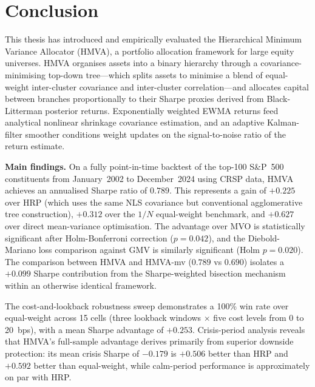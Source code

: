 \documentclass[a4paper,12pt]{report}
\begin{document}
\chapter{Conclusion}
\label{ch:conclusion}

This thesis has introduced and empirically evaluated the Hierarchical Minimum
Variance Allocator (HMVA), a portfolio allocation framework for large equity
universes. HMVA organises assets into a binary hierarchy through a
covariance-minimising top-down tree---which splits assets to minimise a
blend of equal-weight inter-cluster covariance and inter-cluster
correlation---and allocates capital between branches proportionally to their
Sharpe proxies derived from Black-Litterman posterior returns. Exponentially
weighted EWMA returns feed analytical nonlinear shrinkage covariance
estimation, and an adaptive Kalman-filter smoother conditions weight updates
on the signal-to-noise ratio of the return estimate.

\textbf{Main findings.} On a fully point-in-time backtest of the top-100
S\&P~500 constituents from January~2002 to December~2024 using CRSP data,
HMVA achieves an annualised Sharpe ratio of $0.789$. This represents a
gain of $+0.225$ over HRP (which uses the same NLS covariance but
conventional agglomerative tree construction), $+0.312$ over the $1/N$
equal-weight benchmark, and $+0.627$ over direct mean-variance optimisation.
The advantage over MVO is statistically significant after Holm-Bonferroni
correction ($p = 0.042$), and the Diebold-Mariano loss comparison against
GMV is similarly significant (Holm $p = 0.020$). The comparison between
HMVA and HMVA-mv ($0.789$ vs $0.690$) isolates a $+0.099$ Sharpe
contribution from the Sharpe-weighted bisection mechanism within an otherwise
identical framework.

The cost-and-lookback robustness sweep demonstrates a 100\% win rate over
equal-weight across 15 cells (three lookback windows $\times$ five cost
levels from 0 to 20~bps), with a mean Sharpe advantage of $+0.253$.
Crisis-period analysis reveals that HMVA's full-sample advantage derives
primarily from superior downside protection: its mean crisis Sharpe of
$-0.179$ is $+0.506$ better than HRP and $+0.592$ better than
equal-weight, while calm-period performance is approximately on par with
HRP.
\end{document}
